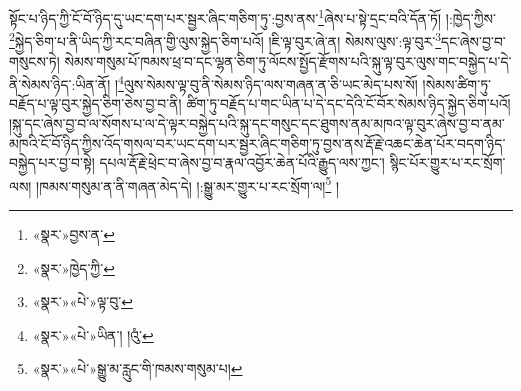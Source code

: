 སྟོང་པ་ཉིད་ཀྱི་ངོ་བོ་ཉིད་དུ་ཡང་དག་པར་སྦྱར་ཞིང་གཅིག་ཏུ་:བྱས་ནས་\footnote{«སྣར་»བྱས་ན་}ཞེས་པ་སྟེ་དྲང་བའི་དོན་ཏོ། །:ཁྱེད་ཀྱིས་\footnote{«སྣར་»ཁྱེད་ཀྱི་}སྐྱེད་ཅིག་པ་ནི་ཡིད་ཀྱི་རང་བཞིན་གྱི་ལུས་སྐྱེད་ཅིག་པའོ། །ཇི་ལྟ་བུར་ཞེ་ན། སེམས་ལུས་:ལྟ་བུར་\footnote{«སྣར་»«པེ་»ལྟ་བུ་}དང་ཞེས་བྱ་བ་གསུངས་ཏེ། སེམས་གསུམ་པོ་ཁམས་ཕྲ་བ་དང་ལྷན་ཅིག་ཏུ་ལོངས་སྤྱོད་རྫོགས་པའི་སྐུ་ལྟ་བུར་ལུས་གང་བསྐྱེད་པ་དེ་ནི་སེམས་ཉིད་:ཡིན་ནོ། །\footnote{«སྣར་»«པེ་»ཡིན་། །འུཾ་}ལུས་སེམས་ལྟ་བུ་ནི་སེམས་ཉིད་ལས་གཞན་ན་ཅི་ཡང་མེད་པས་སོ། །སེམས་ཚིག་ཏུ་བརྗོད་པ་ལྟ་བུར་སྐྱེད་ཅིག་ཅེས་བྱ་བ་ནི། ཚིག་ཏུ་བརྗོད་པ་གང་ཡིན་པ་དེ་དང་དེའི་ངོ་བོར་སེམས་ཉིད་སྐྱེད་ཅིག་པའོ། །སྐུ་དང་ཞེས་བྱ་བ་ལ་སོགས་པ་ལ་དེ་ལྟར་བསྐྱེད་པའི་སྐུ་དང་གསུང་དང་ཐུགས་ནམ་མཁའ་ལྟ་བུར་ཞེས་བྱ་བ་ནམ་མཁའི་ངོ་བོ་ཉིད་ཀྱིས་འོད་གསལ་བར་ཡང་དག་པར་སྦྱར་ཞིང་གཅིག་ཏུ་བྱས་ནས་རྡོ་རྗེ་འཆང་ཆེན་པོར་བདག་ཉིད་བསྐྱེད་པར་བྱ་བ་སྟེ། དཔལ་རྡོ་རྗེ་ཕྲེང་བ་ཞེས་བྱ་བ་རྣལ་འབྱོར་ཆེན་པོའི་རྒྱུད་ལས་ཀྱང་། སྙིང་པོར་གྱུར་པ་རང་སྲོག་ལས། །ཁམས་གསུམ་ན་ནི་གཞན་མེད་དེ། །:སྒྱུ་མར་གྱུར་པ་རང་སྲོག་ལ།\footnote{«སྣར་»«པེ་»སྒྱུ་མ་རླུང་གི་ཁམས་གསུམ་པ།} །
